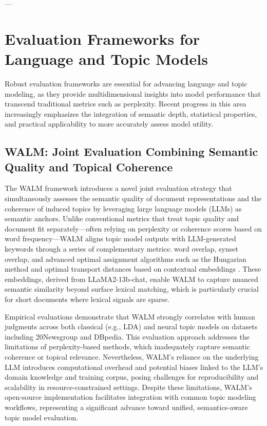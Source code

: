 \documentclass[11pt]{article}
\begin{document}
---

\section{Evaluation Frameworks for Language and Topic Models}

Robust evaluation frameworks are essential for advancing language and topic modeling, as they provide multidimensional insights into model performance that transcend traditional metrics such as perplexity. Recent progress in this area increasingly emphasizes the integration of semantic depth, statistical properties, and practical applicability to more accurately assess model utility.

\subsection{WALM: Joint Evaluation Combining Semantic Quality and Topical Coherence}

The WALM framework introduces a novel joint evaluation strategy that simultaneously assesses the semantic quality of document representations and the coherence of induced topics by leveraging large language models (LLMs) as semantic anchors. Unlike conventional metrics that treat topic quality and document fit separately—often relying on perplexity or coherence scores based on word frequency—WALM aligns topic model outputs with LLM-generated keywords through a series of complementary metrics: word overlap, synset overlap, and advanced optimal assignment algorithms such as the Hungarian method and optimal transport distances based on contextual embeddings \cite{ref47}. These embeddings, derived from LLaMA2-13b-chat, enable WALM to capture nuanced semantic similarity beyond surface lexical matching, which is particularly crucial for short documents where lexical signals are sparse.

Empirical evaluations demonstrate that WALM strongly correlates with human judgments across both classical (e.g., LDA) and neural topic models on datasets including 20Newsgroup and DBpedia. This evaluation approach addresses the limitations of perplexity-based methods, which inadequately capture semantic coherence or topical relevance. Nevertheless, WALM’s reliance on the underlying LLM introduces computational overhead and potential biases linked to the LLM’s domain knowledge and training corpus, posing challenges for reproducibility and scalability in resource-constrained settings. Despite these limitations, WALM’s open-source implementation facilitates integration with common topic modeling workflows, representing a significant advance toward unified, semantics-aware topic model evaluation.
\end{document}
